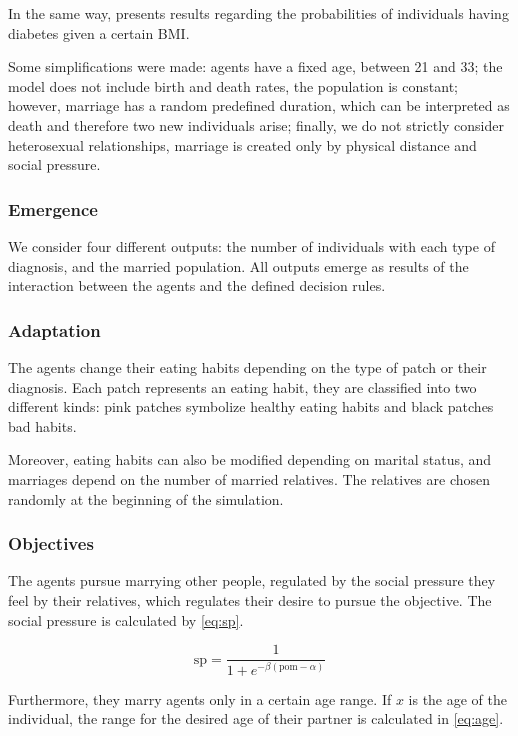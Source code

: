 In the same way, \cite{bays2007relationship} presents results regarding the probabilities of individuals having diabetes given a certain BMI.

Some simplifications were made: agents have a fixed age, between 21 and 33; the model does not include birth and death rates, the population is constant; however, marriage has a random predefined duration, which can be interpreted as death and therefore two new individuals arise; finally, we do not strictly consider heterosexual relationships, marriage is created only by physical distance and social pressure.

\subsubsection{Emergence}
We consider four different outputs: the number of individuals with each type of diagnosis, and the married population. All outputs emerge as results of the interaction between the agents and the defined decision rules. 

\subsubsection{Adaptation}
The agents change their eating habits depending on the type of patch or their diagnosis. Each patch represents an eating habit, they are classified into two different kinds: pink patches symbolize healthy eating habits and black patches bad habits.
 
Moreover, eating habits can also be modified depending on marital status, and marriages depend on the number of married relatives. The relatives are chosen randomly at the beginning of the simulation.

\subsubsection{Objectives}
The agents pursue marrying other people, regulated by the social pressure they feel by their relatives, which regulates their desire to pursue the objective. The social pressure is calculated by \cref{eq:sp}.

\begin{equation}\label{eq:sp}
    \mathrm{sp}=\dfrac{1}{1+e^{-\beta(\mathrm{pom}-\alpha)}}
\end{equation}

Furthermore, they marry agents only in a certain age range. If $x$ is the age of the individual, the range for the desired age of their partner is calculated in \cref{eq:age}.

